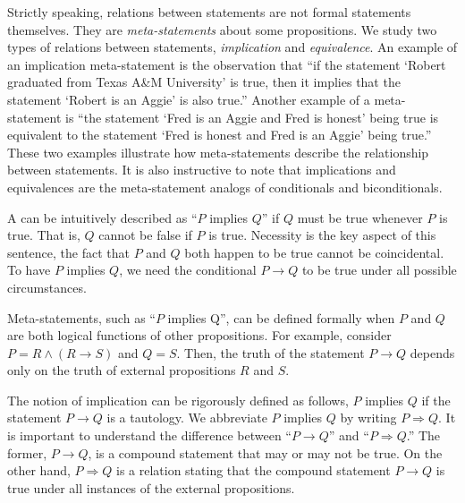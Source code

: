 Strictly speaking, relations between statements are not formal statements themselves.
They are \emph{meta-statements} about some propositions.
We study two types of relations between statements, \emph{implication} and \emph{equivalence}.
An example of an implication meta-statement is the observation that ``if the statement `Robert graduated from Texas A\&M University' is true, then it implies that the statement `Robert is an Aggie' is also true.''
Another example of a meta-statement is ``the statement `Fred is an Aggie and Fred is honest' being true is equivalent to the statement `Fred is honest and Fred is an Aggie' being true.''
These two examples illustrate how meta-statements describe the relationship between statements.
It is also instructive to note that implications and equivalences are the meta-statement analogs of conditionals and biconditionals.

A  can be intuitively described as ``$P$ implies $Q$'' if $Q$ must be true whenever $P$ is true.
That is, $Q$ cannot be false if $P$ is true.
Necessity is the key aspect of this sentence, the fact that $P$ and $Q$ both happen to be true cannot be coincidental.
To have $P$ implies $Q$, we need the conditional $P \rightarrow Q$ to be true under all possible circumstances.

Meta-statements, such as ``$P$ implies Q'', can be defined formally when $P$ and $Q$ are both logical functions of other propositions.
For example, consider $P=R \wedge (R \to S)$ and $Q=S$.
Then, the truth of the statement $P \to Q$ depends only on the truth of external propositions $R$ and $S$.

The notion of implication can be rigorously defined as follows, $P$ implies $Q$ if the statement $P \rightarrow Q$ is a tautology.
We abbreviate $P$ implies $Q$ by writing $P \Rightarrow Q$.
It is important to understand the difference between ``$P \rightarrow Q$'' and ``$P \Rightarrow Q$.''
The former, $P \rightarrow Q$, is a compound statement that may or may not be true.
On the other hand, $P \Rightarrow Q$ is a relation stating that the compound statement $P \rightarrow Q$ is true under all instances of the external propositions.

